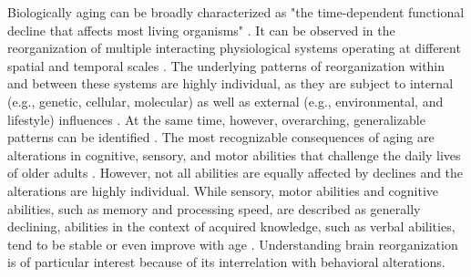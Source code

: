 Biologically aging can be broadly characterized as "the time-dependent functional decline that affects most living organisms" \cite{López-Otín2013}. It can be observed in the reorganization of multiple interacting physiological systems operating at different spatial and temporal scales \cite{Mooney2016}. The underlying patterns of reorganization within and between these systems are highly individual, as they are subject to internal (e.g., genetic, cellular, molecular) as well as external (e.g., environmental, and lifestyle) influences \cite{Smith2020, Mooney2016, Cohen2022}. At the same time, however, overarching, generalizable patterns can be identified \cite{Salthouse2019}. The most recognizable consequences of aging are alterations in cognitive, sensory, and motor abilities that challenge the daily lives of older adults \cite{Li2002}. However, not all abilities are equally affected by declines and the alterations are highly individual. While sensory, motor abilities and cognitive abilities, such as memory and processing speed, are described as generally declining, abilities in the context of acquired knowledge, such as verbal abilities, tend to be stable or even improve with age \cite{Park2009}. Understanding brain reorganization is of particular interest because of its interrelation with behavioral alterations.

